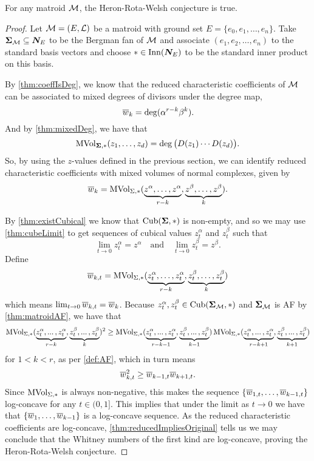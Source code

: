 \documentclass[12pt,oneside]{../../sfsuthesis}
\begin{document}
\begin{Result}
    For any matroid \( \mathcal{M} \), the Heron-Rota-Welsh conjecture is true.
\end{Result}
\begin{proof}
    Let \( \mathcal{M} = (E, \mathcal{L}) \) be a matroid with ground set \( E = \{ e_0, e_1, \dots, e_n \} \).
    Take \( {\bm{\Sigma}}_{\mathcal{M}} \subseteq \bm{N}_E \) to be the Bergman fan of \( \mathcal{M} \) and associate \( (e_1, e_2, \dots, e_n) \) to the standard basis vectors and choose \( \ast \in \operatorname{Inn}(\bm{N}_E) \) to be the standard inner product on this basis.

    By \th\ref{thm:coeffIsDeg}, we know that the reduced characteristic coefficients of \( \mathcal{M} \) can be associated to mixed degrees of divisors under the degree map,
    \[
        \overline{w}_k = \deg(\alpha^{r-k}\beta^k).
    \]
    And by \th\ref{thm:mixedDeg}, we have that
    \[
        \operatorname{MVol}_{{\bm{\Sigma}}, \ast}(z_1, \dots, z_d) = \deg\big( D(z_1) \cdots D(z_d) \big).
    \]
    So, by using the \( z \)-values defined in the previous section, we can identify reduced characteristic coefficients with mixed volumes of normal complexes, given by
    \[
        \overline{w}_k = \operatorname{MVol}_{\Sigma, \ast}(\underbrace{z^\alpha,\ldots,z^\alpha}_{r-k},\underbrace{z^\beta,\ldots,z^\beta}_{k}).
    \]

    By \th\ref{thm:existCubical} we know that \( \operatorname{Cub}({\bm{\Sigma}}, \ast) \) is non-empty, and so we may use \th\ref{thm:cubeLimit} to get sequences of cubical values \( z_t^\alpha \) and \( z_t^\beta \) such that
    \[
        \lim_{t \to 0 } z_t^\alpha = z^\alpha \quad \text{and} \quad  \lim_{t \to 0 } z_t^\beta = z^\beta.
    \]
    Define
    \[
        \overline{w}_{k,t} = \operatorname{MVol}_{\Sigma, \ast}(\underbrace{z_t^\alpha,\ldots,z_t^\alpha}_{r-k},\underbrace{z_t^\beta,\ldots,z_t^\beta}_{k})
    \]
    which means \( \lim_{t \to 0} \overline{w}_{k,t} = \overline{w}_k \).
    Because \( z_t^\alpha, z_t^\beta \in \operatorname{Cub}({\bm{\Sigma}}_{\mathcal{M}}, \ast) \) and \( {\bm{\Sigma}}_{\mathcal{M}} \) is AF by \th\ref{thm:matroidAF}, we have that
    \[
        \MVol_{\Sigma, \ast}(\underbrace{z_t^\alpha,\mydots,z_t^\alpha}_{r-k},\underbrace{z_t^\beta,\mydots,z_t^\beta}_{k})^2
        \geq
        \MVol_{\Sigma, \ast}(\underbrace{z_t^\alpha,\mydots,z_t^\alpha}_{r-k-1},\underbrace{z_t^\beta,\mydots,z_t^\beta}_{k-1})
        \MVol_{\Sigma, \ast}(\underbrace{z_t^\alpha,\mydots,z_t^\alpha}_{r-k+1},\underbrace{z_t^\beta,\mydots,z_t^\beta}_{k+1})
    \]
    for \( 1 < k < r \), as per \th\ref{def:AF}, which in turn means
    \[
        \overline{w}_{k,t}^2 \geq \overline{w}_{k-1,t}\overline{w}_{k+1,t}.
    \]
    Since \( \operatorname{MVol}_{\Sigma, \ast} \) is always non-negative, this makes the sequence \( \{ \overline{w}_{1,t}, \dots, \overline{w}_{k-1,t}  \} \) log-concave for any \( t \in (0,1] \).
    This implies that under the limit as \( t \to 0 \) we have that \( \{ \overline{w}_{1}, \dots, \overline{w}_{k-1} \} \) is a log-concave sequence.
    As the reduced characteristic coefficients are log-concave, \th\ref{thm:reducedImpliesOriginal} tells us we may conclude that the Whitney numbers of the first kind are log-concave, proving the Heron-Rota-Welsh conjecture.

\end{proof}
\end{document}
